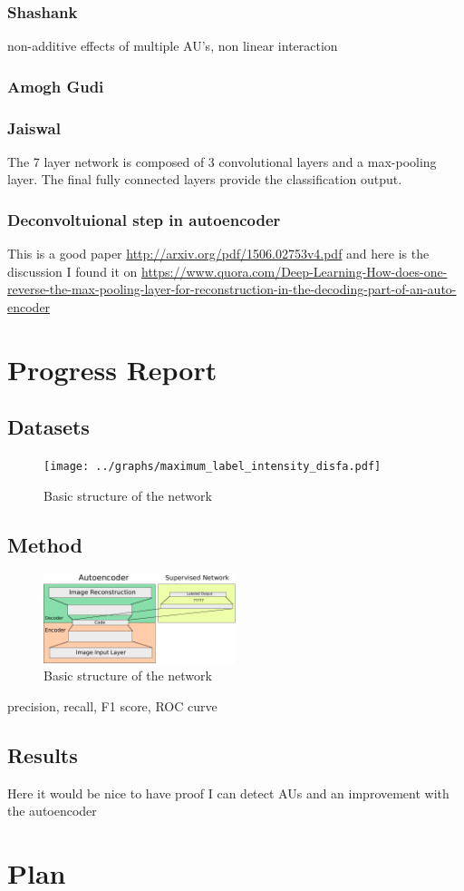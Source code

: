 \documentclass[11pt]{article} \usepackage{amsmath, amsthm, amssymb}
\begin{document}
\subsubsection*{Shashank}
non-additive
effects of multiple AU's, non linear interaction

\subsubsection*{Amogh Gudi}
\cite{Gudi2015}

\subsubsection*{Jaiswal}
\cite{Jaiswal2016}
The 7 layer network is composed of 3 convolutional
layers and a max-pooling layer. The final fully connected layers provide the
classification output.
\subsubsection*{Deconvoltuional step in autoencoder} This is
a good paper \url{http://arxiv.org/pdf/1506.02753v4.pdf} and here is the
discussion I found it on
\url{https://www.quora.com/Deep-Learning-How-does-one-reverse-the-max-pooling-layer-for-reconstruction-in-the-decoding-part-of-an-auto-encoder}


\section{Progress Report}
%
%
%
\subsection{Datasets}
\begin{figure} \begin{center}
\texttt{[image: ../graphs/maximum\_label\_intensity\_disfa.pdf]} \end{center}
\caption{Basic structure of the network} \end{figure}


%
%
%
\subsection{Method}
\begin{figure} \begin{center}
\includegraphics[width=0.5\textwidth]{illustrations/network_01.pdf} \end{center}
\caption{Basic structure of the network} \end{figure}
precision, recall, F1 score, ROC curve
%
%
%
\subsection{Results}
Here it would be nice to have proof I can detect AUs and an improvement with the autoencoder
%
%
%
\section{Plan}




\end{document}
